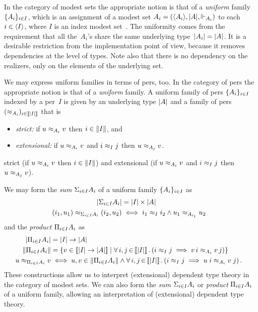 \iflong
In the category of modest sets the appropriate notion is that of a
\emph{uniform} family~$\{A_i\}_{i \in I}$, which is an assignment
of a modest set $A_i = (\langle A_i \rangle, |A|, {\Vdash_{A_i}})$ to each
$i \in \langle I \rangle$, where $I$ is an index modest
set~\cite[6.3]{JacobsB:cltt}. The uniformity comes from the
requirement that all the~$A_i$'s share the same underlying
type~$|A_i| = |A|$. It is a desirable restriction from
the implementation point of view, because it removes dependencies at
the level of types. Note also that there is no dependency on the
realizers, only on the elements of the underlying set.

We may express uniform families in terms of pers, too.
\else
In the category of pers the appropriate notion is that of a
\emph{uniform} family.
%
\fi
A uniform family of pers $\{A_i\}_{i \in I}$ indexed
by a per~$I$ is given by an underlying type $|A|$ and a family
of pers $(\approx_{A_i})_{i \in [\![|I|]\!]}$ that is
% 
\iflong
\begin{itemize}
\item \emph{strict:} if $u \approx_{A_i} v$ then $i \in \|I\|$, and
\item \emph{extensional:} if $u \approx_{A_i} v$ and $i \approx_I j$ then $u
  \approx_{A_j} v$.
\end{itemize}
\else %
strict (if $u \approx_{A_i} v$ then $i \in \|I\|$) and
extensional (if $u \approx_{A_i} v$ and $i \approx_I j$ then $u
  \approx_{A_j} v$).
\fi %

\iflong
We may form the \emph{sum} ${\Sigma_{i \in I} A_i}$ of a uniform family
$\{A_i\}_{i \in I}$ as
%
\begin{align*}
  |{\Sigma_{i \in I} A_i}| &=
  |I| \times |A|
  \\
  (i_1, u_1) \approx_{{\Sigma_{i \in I} A_i}} (i_2, u_2)
  &\iff
  i_1 \approx_I i_2 \land u_1 \approx_{A_{i_1}} u_2
\end{align*}
%
and the \emph{product} ${\Pi_{i \in I} A_i}$ as
%
\begin{align*}
  |{\Pi_{i \in I} A_i}| &=
  |I| \to |A|
  \\
  \|{\Pi_{i \in I} A_i}\| &=
  \{v \in [\![|I| \to |A|]\!] \mid
    \forall\, i, j \,{\in}\, [\![|I|]\!]\,.\left(i \approx_{I} j \implies v\,i
      \approx_{A_i} v\,j\right)
    \} \\
  u \approx_{{\Pi_{i \in I} A_i}} v
  &\iff
  u, v \in \|{\Pi_{i \in I} A_i}\| \land
  \forall\, i,j \,{\in}\, [\![|I|]\!]\,.\left(
    i \approx_I j \implies u\;i \approx_{A_i} v\;j
  \right).
\end{align*}
%
These constructions allow us to interpret (extensional) dependent type
theory in the category of modest sets.
\else %
We can also form the \emph{sum} ${\Sigma_{i \in I} A_i}$ or
\emph{product} ${\Pi_{i \in I} A_i}$ of
a uniform family, allowing an interpretation of (extensional) dependent type
theory.
\fi %

